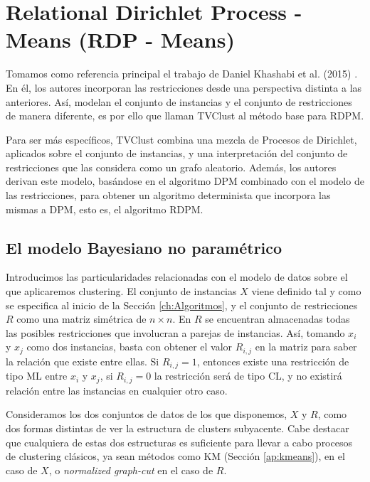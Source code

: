\section{Relational Dirichlet Process - Means (RDP - Means)} \label{rdpmYtvc}

Tomamos como referencia principal el trabajo de Daniel Khashabi et al. (2015) \cite{RDPM:2015}. En él, los autores incorporan las restricciones desde una perspectiva distinta a las anteriores. Así, modelan el conjunto de instancias y el conjunto de restricciones de manera diferente, es por ello que llaman \acf{TVClust} al método base para \acf{RDPM}.

Para ser más específicos, \acs{TVClust} combina una mezcla de Procesos de Dirichlet, aplicados sobre el conjunto de instancias, y una interpretación del conjunto de restricciones que las considera como un grafo aleatorio. Además, los autores derivan este modelo, basándose en el algoritmo \acf{DPM} \cite{DPM:2012} combinado con el modelo de las restricciones, para obtener un algoritmo determinista que incorpora las mismas a \acs{DPM}, esto es, el algoritmo \acf{RDPM}.

\subsection{El modelo Bayesiano no paramétrico}

Introducimos las particularidades relacionadas con el modelo de datos sobre el que aplicaremos clustering. El conjunto de instancias $X$ viene definido tal y como se especifica al inicio de la Sección \ref{ch:Algoritmos}, y el conjunto de restricciones $R$ como una matriz simétrica de $n \times n$. En $R$ se encuentran almacenadas todas las posibles restricciones que involucran a parejas de instancias. Así, tomando $x_i$ y $x_j$ como dos instancias, basta con obtener el valor $R_{i,j}$ en la matriz para saber la relación que existe entre ellas. Si $R_{i,j} = 1$, entonces existe una restricción de tipo \acf{ML} entre $x_i$ y $x_j$, si $R_{i,j} = 0$ la restricción será de tipo \acf{CL}, y no existirá relación entre las instancias en cualquier otro caso.

Consideramos los dos conjuntos de datos de los que disponemos, $X$ y $R$, como dos formas distintas de ver la estructura de clusters subyacente. Cabe destacar que cualquiera de estas dos estructuras es suficiente para llevar a cabo procesos de clustering clásicos, ya sean métodos como \acf{KM} (Sección \ref{ap:kmeans}), en el caso de $X$, o \textit{normalized graph-cut} en el caso de $R$.

